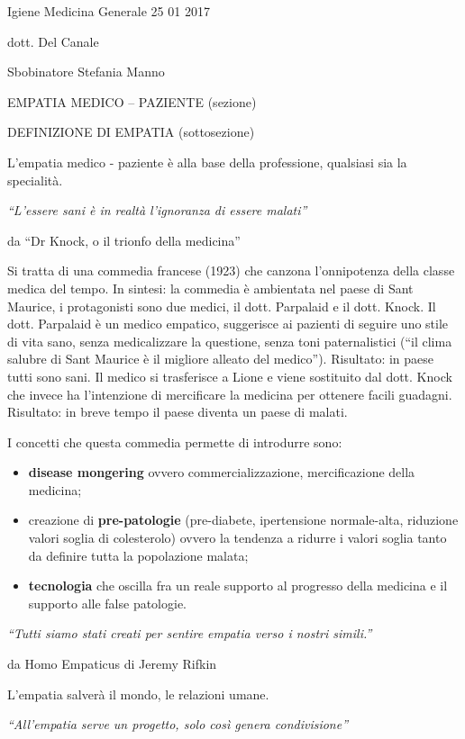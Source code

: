 \documentclass[]{article}
\date{}
\begin{document}
Igiene Medicina Generale 25 01 2017

dott. Del Canale

Sbobinatore Stefania Manno

EMPATIA MEDICO -- PAZIENTE (sezione)

DEFINIZIONE DI EMPATIA (sottosezione)

L'empatia medico - paziente è alla base della professione, qualsiasi sia
la specialità.

\emph{``L'essere sani è in realtà l'ignoranza di essere malati''}

da ``Dr Knock, o il trionfo della medicina''

Si tratta di una commedia francese (1923) che canzona l'onnipotenza
della classe medica del tempo. In sintesi: la commedia è ambientata nel
paese di Sant Maurice, i protagonisti sono due medici, il dott.
Parpalaid e il dott. Knock. Il dott. Parpalaid è un medico empatico,
suggerisce ai pazienti di seguire uno stile di vita sano, senza
medicalizzare la questione, senza toni paternalistici (``il clima
salubre di Sant Maurice è il migliore alleato del medico''). Risultato:
in paese tutti sono sani. Il medico si trasferisce a Lione e viene
sostituito dal dott. Knock che invece ha l'intenzione di mercificare la
medicina per ottenere facili guadagni. Risultato: in breve tempo il
paese diventa un paese di malati.

I concetti che questa commedia permette di introdurre sono:

\begin{itemize}
\item
  \textbf{disease mongering} ovvero commercializzazione, mercificazione
  della medicina;
\item
  creazione di \textbf{pre-patologie} (pre-diabete, ipertensione
  normale-alta, riduzione valori soglia di colesterolo) ovvero la
  tendenza a ridurre i valori soglia tanto da definire tutta la
  popolazione malata;
\item
  \textbf{tecnologia} che oscilla fra un reale supporto al progresso
  della medicina e il supporto alle false patologie.
\end{itemize}

\emph{``Tutti siamo stati creati per sentire empatia verso i nostri
simili.''}

da Homo Empaticus di Jeremy Rifkin

L'empatia salverà il mondo, le relazioni umane.

\emph{``All'empatia serve un progetto, solo così genera condivisione''}
\end{document}
